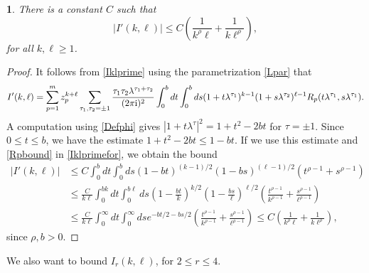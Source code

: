 \documentclass{article}
\numberwithin{equation}{section}
\numberwithin{figure}{section}
\theoremstyle{plain}
\theoremstyle{plain}
\newtheorem{lemma}[thm]{\protect\lemmaname}
\numberwithin{thm}{section}
\theoremstyle{remark}
\providecommand{\lemmaname}{Lemma}
\newcommand{\I}{{\rm i}}
\let \le \leqslant
\let \ge \geqslant
\begin{document}
\begin{lemma}\label{Lem:Iklprimeest}
There is a constant $C$ such that
\begin{equation}\label{Iklprimeest}
|I'(k,\ell)|\le C\left(\frac 1{k^\rho\ell}+\frac 1{k\ell^\rho}\right),
\end{equation}
for all $k,\ell\ge 1$.
\end{lemma}

\begin{proof}
It follows from \eqref{Iklprime} using the parametrization \eqref{Lpar} that
\begin{equation}\label{Iklprimefor}
I'(k,\ell)=\sum_{p=1}^m z_p^{k+\ell}\sum_{\tau_1,\tau_2=\pm 1}\frac{\tau_1\tau_2 \lambda^{\tau_1+\tau_2}}{(2\pi\I)^2}\int_0^b dt\int_0^b ds(1+t\lambda^{\tau_1})^{k-1}
(1+s\lambda^{\tau_2})^{\ell-1}R_p(t\lambda^{\tau_1},s\lambda^{\tau_1}).
\end{equation}
A computation using \eqref{Defphi} gives $|1+t\lambda^\tau|^2=1+t^2-2bt$ for $\tau=\pm 1$. Since $0\le t\le b$, we have the estimate $1+t^2-2bt\le 1-bt$. If we use this estimate and
\eqref{Rpbound} in \eqref{Iklprimefor}, we obtain the bound
\begin{align*}
|I'(k,\ell)|&\le C\int_0^b dt\int_0^b ds(1-bt)^{(k-1)/2}(1-bs)^{(\ell-1)/2}(t^{\rho-1}+s^{\rho-1})\\
&\le \frac{C}{k\ell}\int_0^{bk} dt\int_0^{b\ell} ds\left(1-\frac{bt}k\right)^{k/2}\left(1-\frac{bs}\ell\right)^{\ell/2}\left(\frac{t^{\rho-1}}{k^{\rho-1}}+\frac{s^{\rho-1}}{\ell^{\rho-1}}\right)\\
&\le \frac{C}{k\ell}\int_0^{\infty} dt\int_0^{\infty} ds e^{-bt/2-bs/2}\left(\frac{t^{\rho-1}}{k^{\rho-1}}+\frac{s^{\rho-1}}{\ell^{\rho-1}}\right)\le C\left(\frac 1{k^\rho\ell}+\frac 1{k\ell^\rho}\right),
\end{align*}
since $\rho,b>0$.
\end{proof}

We also want to bound $I_r(k,\ell)$, for $2\le r\le 4$.
\end{document}
